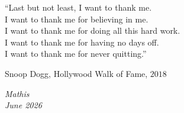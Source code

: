 \medskip

\epigraph{“Last but not least, I want to thank me. \\ I want to thank me for believing in me. \\ I want to thank me for doing all this hard work. \\ I want to thank me for having no days off. \\ I want to thank me for never quitting.”}{Snoop Dogg, Hollywood Walk of Fame, $2018$}

\begin{flushright}
{\makeatletter\itshape
    Mathis\\
    June 2026
\makeatother}
\end{flushright}

\vspace*{\fill}
\cleardoublepage